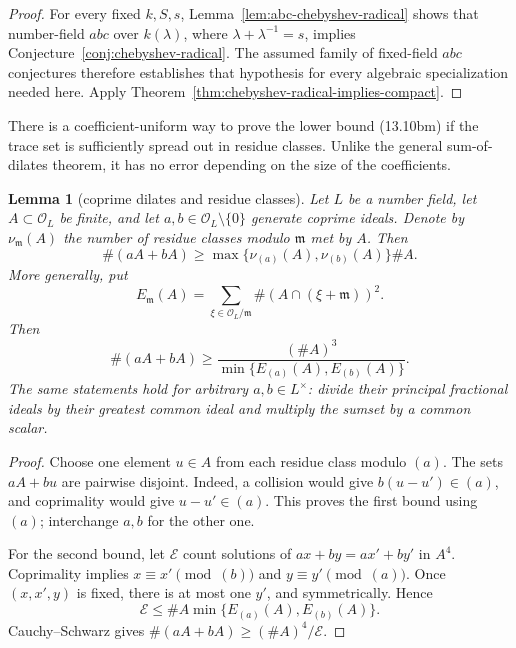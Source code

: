 \documentclass[11pt,reqno]{amsart}
\newtheorem{lemma}[theorem]{Lemma}
\theoremstyle{definition}
\theoremstyle{remark}
\begin{document}
\begin{proof}
For every fixed \(k,S,s\), Lemma~\ref{lem:abc-chebyshev-radical} shows
that number-field \(abc\) over \(k(\lambda)\), where
\(\lambda+\lambda^{-1}=s\), implies
Conjecture~\ref{conj:chebyshev-radical}.  The assumed family of
fixed-field \(abc\) conjectures therefore establishes that hypothesis for
every algebraic specialization needed here.  Apply
Theorem~\ref{thm:chebyshev-radical-implies-compact}.
\end{proof}

There is a coefficient-uniform way to prove the lower bound (13.10bm) if
the trace set is sufficiently spread out in residue classes.  Unlike the
general sum-of-dilates theorem, it has no error depending on the size of the
coefficients.

\begin{lemma}[coprime dilates and residue classes]
\label{lem:coprime-dilate-residues}
Let \(L\) be a number field, let \(A\subset\mathcal O_L\) be finite, and
let \(a,b\in\mathcal O_L\setminus\{0\}\) generate coprime ideals.  Denote
by \(\nu_{\mathfrak m}(A)\) the number of residue classes modulo
\(\mathfrak m\) met by \(A\).  Then
\[
 \#(aA+bA)\ge
 \max\{\nu_{(a)}(A),\nu_{(b)}(A)\}\#A.
\tag{13.10bp}
\]
More generally, put
\[
 E_{\mathfrak m}(A)=
 \sum_{\xi\in\mathcal O_L/\mathfrak m}
       \#(A\cap(\xi+\mathfrak m))^2.
\]
Then
\[
 \#(aA+bA)
 \ge \frac{(\#A)^3}
 {\min\{E_{(a)}(A),E_{(b)}(A)\}}.
\tag{13.10bq}
\]
The same statements hold for arbitrary \(a,b\in L^\times\): divide their
principal fractional ideals by their greatest common ideal and multiply the
sumset by a common scalar.
\end{lemma}

\begin{proof}
Choose one element \(u\in A\) from each residue class modulo \((a)\).
The sets \(aA+bu\) are pairwise disjoint.  Indeed, a collision would give
\(b(u-u')\in(a)\), and coprimality would give \(u-u'\in(a)\).  This proves
the first bound using \((a)\); interchange \(a,b\) for the other one.

For the second bound, let \(\mathcal E\) count solutions of
\(ax+by=ax'+by'\) in \(A^4\).  Coprimality implies
\(x\equiv x'\pmod{(b)}\) and
\(y\equiv y'\pmod{(a)}\).  Once \((x,x',y)\) is fixed, there is at most
one \(y'\), and symmetrically.  Hence
\[
 \mathcal E\le
 \#A\min\{E_{(a)}(A),E_{(b)}(A)\}.
\]
Cauchy--Schwarz gives \(\#(aA+bA)\ge(\#A)^4/\mathcal E\).
\end{proof}
\end{document}

